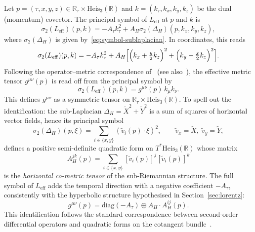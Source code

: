 \documentclass[11pt,a4paper]{article}
\theoremstyle{definition}
\theoremstyle{remark}
\newcommand{\HeisR}{\mathrm{Heis}_3(\mathbb{R})}
\newcommand{\DeltaH}{\Delta_H}
\begin{document}
    Let $p = (\tau, x, y, z) \in \mathbb{R}_\tau \times \HeisR$ and
    $k = (k_\tau, k_x, k_y, k_z)$ be the dual (momentum) covector.
    The principal symbol of $L_{\mathrm{eff}}$ at $p$ and $k$ is
    \begin{equation}
      \sigma_2(L_{\mathrm{eff}})(p, k) = -A_\tau k_\tau^2 + A_H \sigma_2(\DeltaH)(p, k_x, k_y, k_z),
      \label{eq:symbol-leff}
    \end{equation}
    where $\sigma_2(\DeltaH)$ is given by~\eqref{eq:symbol-sublaplacian}.
    In coordinates, this reads
    \begin{equation}
      \sigma_2(L_{\mathrm{eff}})(p,k)
      = -A_\tau k_\tau^2
      + A_H \Bigl[\Bigl(k_x + \tfrac{y}{2}k_z\Bigr)^2 + \Bigl(k_y - \tfrac{x}{2}k_z\Bigr)^2\Bigr].
      \label{eq:symbol-expanded}
    \end{equation}
    Following the operator--metric correspondence of~\cite{Beau2026c} (see
  also~\cite{Beau2026a}), the effective metric tensor $g^{\mu\nu}(p)$ is read off
    from the principal symbol by
    \begin{equation}
      \sigma_2(L_{\mathrm{eff}})(p,k) = g^{\mu\nu}(p)\,k_\mu k_\nu.
      \label{eq:op-metric}
    \end{equation}
    This defines $g^{\mu\nu}$ as a symmetric tensor on $\mathbb{R}_\tau \times \HeisR$.
    To spell out the identification: the sub-Laplacian $\DeltaH = \tilde X^2 + \tilde Y^2$
    is a sum of squares of horizontal vector fields, hence its principal symbol
    \begin{equation}
      \sigma_2(\DeltaH)(p,\xi) = \sum_{i \in \{x,y\}}
      (\tilde v_i(p) \cdot \xi)^2, \qquad \tilde v_x = \tilde X,\; \tilde v_y = \tilde Y,
      \label{eq:symbol-as-sum}
    \end{equation}
    defines a positive semi-definite quadratic form on $T^*\HeisR$ whose matrix
    \[
      A^{jk}_H(p) = \sum_{i \in \{x,y\}} [\tilde v_i(p)]^j [\tilde v_i(p)]^k
    \]
    is the \emph{horizontal co-metric tensor} of the sub-Riemannian structure.
    The full symbol of $L_{\mathrm{eff}}$ adds the temporal direction with a negative
    coefficient $-A_\tau$, consistently with the hyperbolic structure hypothesised
    in Section~\ref{sec:lorentz}:
    \begin{equation}
      g^{\mu\nu}(p) = \mathrm{diag}(-A_\tau) \oplus A_H \cdot A^{ij}_H(p).
      \label{eq:full-cometric}
    \end{equation}
    This identification follows the standard correspondence between second-order
    differential operators and quadratic forms on the cotangent bundle~\cite{Beau2026c,Beau2026a}.
\end{document}
